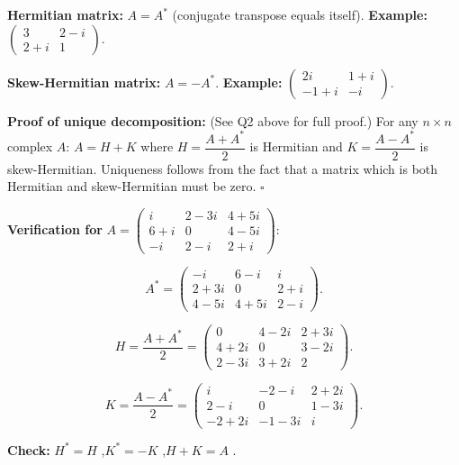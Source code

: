 \documentclass[12pt,a3paper]{article}
\begin{document}
\begin{tcolorbox}[enhanced,breakable,
  colback=cG!4,colframe=cG,boxrule=0.8pt,arc=5pt,
  title={\textbf{Answer --- Hermitian/Skew-Hermitian; Unique Decomposition; Verification}},
  fonttitle=\bfseries\color{white},colbacktitle=cG]
 
\textbf{Hermitian matrix:} $A = A^*$ (conjugate transpose equals itself).
\textbf{Example:} $\begin{pmatrix}3&2-i\\2+i&1\end{pmatrix}$.
 
\medskip
\textbf{Skew-Hermitian matrix:} $A = -A^*$.
\textbf{Example:} $\begin{pmatrix}2i&1+i\\-1+i&-i\end{pmatrix}$.
 
\medskip
\textbf{Proof of unique decomposition:} (See Q2 above for full proof.)
For any $n\times n$ complex $A$: $A = H + K$ where $H = \dfrac{A+A^*}{2}$ is Hermitian
and $K = \dfrac{A-A^*}{2}$ is skew-Hermitian. Uniqueness follows from the fact that
a matrix which is both Hermitian and skew-Hermitian must be zero. \hfill$\square$
 
\medskip
\textbf{Verification for} $A=\begin{pmatrix}i&2-3i&4+5i\\6+i&0&4-5i\\-i&2-i&2+i\end{pmatrix}$:
 
\[
A^* = \begin{pmatrix}-i&6-i&i\\2+3i&0&2+i\\4-5i&4+5i&2-i\end{pmatrix}.
\]
 
\[
H = \frac{A+A^*}{2} = \begin{pmatrix}0&4-2i&2+3i\\4+2i&0&3-2i\\2-3i&3+2i&2\end{pmatrix}.
\]
 
\[
K = \frac{A-A^*}{2} = \begin{pmatrix}i&-2-i&2+2i\\2-i&0&1-3i\\-2+2i&-1-3i&i\end{pmatrix}.
\]
 
\textbf{Check:}
$H^* = H$ \checkmark,\quad $K^* = -K$ \checkmark,\quad $H + K = A$ \checkmark.
 
\end{tcolorbox}
\end{document}
